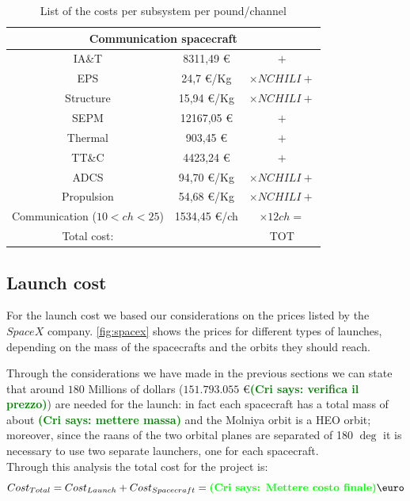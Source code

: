 \documentclass[11pt,a4paper,titlepage]{article}
\newcommand{\cri}[1]{\textcolor{green}{\textbf{(Cri says: #1)}}}
\begin{document}
		\begin{table}
			\centering
			\begin{tabular}{ccc}
			\toprule
			\multicolumn{3}{c}{Communication spacecraft}\\
			\midrule
			IA\&T       & 8311,49 \euro       & $+$\\
			EPS          & 24,7 \euro/Kg        & $\times NCHILI +$\\
			Structure   & 15,94  \euro/Kg     & $\times NCHILI +$\\
			SEPM        & 12167,05 \euro     & $+$\\
			Thermal    & 903,45 \euro        & $+$\\
			TT\&C       & 4423,24 \euro      & $+$\\ 
			ADCS        & 94,70 \euro/Kg     & $\times NCHILI +$\\
			Propulsion & 54,68   \euro/Kg   & $\times NCHILI +$\\
			Communication ($10 < ch < 25$) & 1534,45 \euro/ch & $\times 12 ch =$\\
			\bottomrule
			Total cost:& & TOT\\
			\end{tabular}
			\caption{List of the costs per subsystem per pound/channel}
			\label{tab:cost}
		\end{table}
	\subsection{Launch cost}
For the launch cost we based our considerations on the prices listed by the $SpaceX$ company. \autoref{fig:spacex} shows the prices for different types of launches, depending on the mass of the spacecrafts and the orbits they should reach.

Through the considerations we have made in the previous sections we can state that around $180$ Millions of dollars ($151.793.055$ \euro \cri{verifica il prezzo}) are needed for the launch: in fact each spacecraft has a total mass of about \cri{mettere massa} and the Molniya orbit is a HEO orbit; moreover, since the raans of the two orbital planes are separated of 180 $\deg$ it is necessary to use two separate launchers, one for each spacecraft.\\

Through this analysis the total cost for the project is:
\begin{equation}
Cost_{Total} = Cost_{Launch} + Cost_{Spacecraft} = \cri{Mettere costo finale} \text{\euro}
\end{equation}
\end{document}
